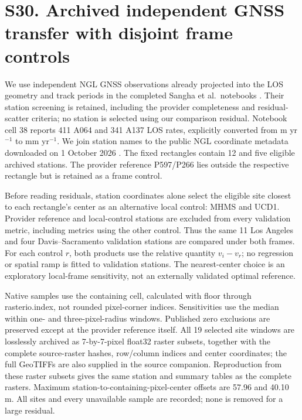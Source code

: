 \documentclass[10pt,a4paper]{article}
\begin{document}
\section*{S30. Archived independent GNSS transfer with disjoint frame controls}
We use independent NGL GNSS observations already projected into the LOS geometry and track periods in the completed Sangha et al.\ notebooks \citep{sangha2026california,sangha2026data}. Their station screening is retained, including the provider completeness and residual-scatter criteria; no station is selected using our comparison residual. Notebook cell 38 reports 411 A064 and 341 A137 LOS rates, explicitly converted from m yr$^{-1}$ to mm yr$^{-1}$. We join station names to the public NGL coordinate metadata downloaded on 1 October 2026 \citep{ngl2026holdings}. The fixed rectangles contain 12 and five eligible archived stations. The provider reference P597/P266 lies outside the respective rectangle but is retained as a frame control.

Before reading residuals, station coordinates alone select the eligible site closest to each rectangle's center as an alternative local control: MHMS and UCD1. Provider reference and local-control stations are excluded from every validation metric, including metrics using the other control. Thus the same 11 Los Angeles and four Davis--Sacramento validation stations are compared under both frames. For each control $r$, both products use the relative quantity $v_i-v_r$; no regression or spatial ramp is fitted to validation stations. The nearest-center choice is an exploratory local-frame sensitivity, not an externally validated optimal reference.

Native samples use the containing cell, calculated with floor through rasterio.index, not rounded pixel-corner indices. Sensitivities use the median within one- and three-pixel-radius windows. Published zero exclusions are preserved except at the provider reference itself. All 19 selected site windows are losslessly archived as 7-by-7-pixel float32 raster subsets, together with the complete source-raster hashes, row/column indices and center coordinates; the full GeoTIFFs are also supplied in the source companion. Reproduction from these raster subsets gives the same station and summary tables as the complete rasters. Maximum station-to-containing-pixel-center offsets are 57.96 and 40.10 m. All sites and every unavailable sample are recorded; none is removed for a large residual.
\end{document}
